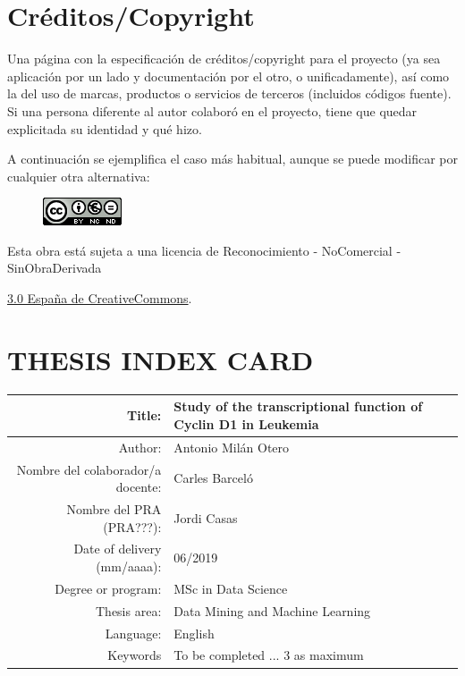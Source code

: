\setcounter{page}{1} 
\pagestyle{plain}

\chapter*{Créditos/Copyright}

Una página con la especificación de créditos/copyright para el proyecto (ya sea aplicación por un lado y documentación por el otro, o unificadamente), así como la del uso de marcas, productos o servicios de terceros (incluidos códigos fuente). Si una persona diferente al autor colaboró en el proyecto, tiene que quedar explicitada su identidad y qué hizo.

A continuación se ejemplifica el caso más habitual, aunque se puede modificar por cualquier otra alternativa:

\vspace{1cm}

\begin{figure}[ht]
    \centering
	\includegraphics[scale=1]{images/license.png}
\end{figure}

Esta obra está sujeta a una licencia de Reconocimiento -  NoComercial - SinObraDerivada

\href{https://creativecommons.org/licenses/by-nc-nd/3.0/es/}{3.0 España de CreativeCommons}.

\chapter*{THESIS INDEX CARD}

\begin{table}[ht]
	\centering{}
	\renewcommand{\arraystretch}{2}
	\begin{tabular}{r | l}
		\hline
		Title: & Study of the transcriptional function of Cyclin D1 in Leukemia\\
		\hline
        Author: & Antonio Milán Otero\\
		\hline
        Nombre del colaborador/a docente: & Carles Barceló\\
		\hline
        Nombre del PRA (PRA???): & Jordi Casas\\
		\hline
        Date of delivery (mm/aaaa): & 06/2019\\
		\hline
        Degree or program: & MSc in Data Science\\
		\hline
        Thesis area: & Data Mining and Machine Learning\\
		\hline
        Language: & English\\
		\hline
        Keywords & To be completed ... 3 as maximum\\
		\hline
	\end{tabular}
\end{table}

